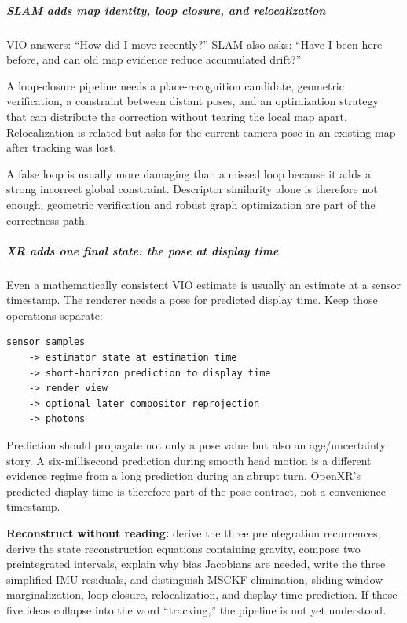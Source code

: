 \subparagraph{SLAM adds map identity, loop closure, and relocalization}\label{04-visual-computing-ii-ch035-slam-adds-map-identity-loop-closure-and-relocalization}

VIO answers: ``How did I move recently?'' SLAM also asks: ``Have I been here before, and can old map evidence reduce accumulated drift?''

A loop-closure pipeline needs a place-recognition candidate, geometric verification, a constraint between distant poses, and an optimization strategy that can distribute the correction without tearing the local map apart. Relocalization is related but asks for the current camera pose in an existing map after tracking was lost.

A false loop is usually more damaging than a missed loop because it adds a strong incorrect global constraint. Descriptor similarity alone is therefore not enough; geometric verification and robust graph optimization are part of the correctness path.

\subparagraph{XR adds one final state: the pose at display time}\label{04-visual-computing-ii-ch035-xr-adds-one-final-state-the-pose-at-display-time}

Even a mathematically consistent VIO estimate is usually an estimate at a sensor timestamp. The renderer needs a pose for predicted display time. Keep those operations separate:

\begin{verbatim}
sensor samples
    -> estimator state at estimation time
    -> short-horizon prediction to display time
    -> render view
    -> optional later compositor reprojection
    -> photons
\end{verbatim}

Prediction should propagate not only a pose value but also an age/uncertainty story. A six-millisecond prediction during smooth head motion is a different evidence regime from a long prediction during an abrupt turn. OpenXR's predicted display time is therefore part of the pose contract, not a convenience timestamp.

\textbf{Reconstruct without reading:} derive the three preintegration recurrences, derive the state reconstruction equations containing gravity, compose two preintegrated intervals, explain why bias Jacobians are needed, write the three simplified IMU residuals, and distinguish MSCKF elimination, sliding-window marginalization, loop closure, relocalization, and display-time prediction. If those five ideas collapse into the word ``tracking,'' the pipeline is not yet understood.

